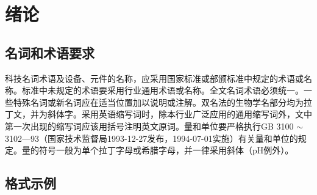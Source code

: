 
\chapter{绪论}
\label{chap:introduction}




%
%

\section{名词和术语要求}\label{sec:system}

科技名词术语及设备、元件的名称，应采用国家标准或部颁标准中规定的术语或名称。标准中未规定的术语要采用行业通用术语或名称。全文名词术语必须统一。一些特殊名词或新名词应在适当位置加以说明或注解。双名法的生物学名部分均为拉丁文，并为斜体字。采用英语缩写词时，除本行业广泛应用的通用缩写词外，文中第一次出现的缩写词应该用括号注明英文原词。量和单位要严格执行GB 3100 $\sim$ 3102—93（国家技术监督局1993-12-27发布，1994-07-01实施）有关量和单位的规定。量的符号一般为单个拉丁字母或希腊字母，并一律采用斜体（pH例外）。



\section{格式示例}

